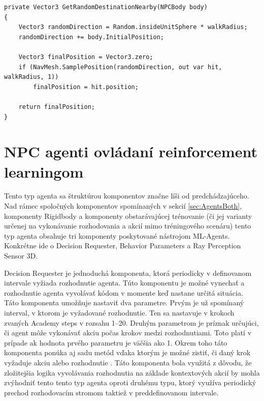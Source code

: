 \documentclass[slovak, master]{diploma}
\begin{document}
\vspace{8pt}
\begin{lstlisting}[label=src:GenRandom,caption={Generovanie náhodného bodu v okolí NPC pomocou NavMeshu}]
private Vector3 GetRandomDestinationNearby(NPCBody body)
{
    Vector3 randomDirection = Random.insideUnitSphere * walkRadius;
    randomDirection += body.InitialPosition;
    
    Vector3 finalPosition = Vector3.zero;
    if (NavMesh.SamplePosition(randomDirection, out var hit, walkRadius, 1))
        finalPosition = hit.position;

    return finalPosition;
}
\end{lstlisting}

\section{NPC agenti ovládaní reinforcement learningom}
\label{sec:AgentsWithBrain}
Tento typ agenta sa štruktúrou komponentov značne líši od predchádzajúceho. Nad rámec spoločných komponentov spomínaných v sekcií \ref{sec:AgentsBoth}, komponenty Rigidbody a komponenty obstarávajúcej trénovanie (či jej varianty určenej na vykonávanie rozhodovania a akcií mimo tréningového scenáru) tento typ agenta obsahuje tri komponenty poskytované nástrojom ML-Agents. Konkrétne ide o Decision Requester, Behavior Parameters a Ray Perception Sensor 3D.

Decision Requester je jednoduchá komponenta, ktorá periodicky v definovanom intervale vyžiada rozhodnutie agenta. Túto komponentu je možné vynechať a rozhodnutie agenta vyvolávať kódom v momente keď nastane určitá situácia. Táto komponenta umožňuje nastaviť dva parametre. Prvým je už spomínaný interval, v ktorom je vyžadované rozhodnutie. Ten sa nastavuje v krokoch zvaných Academy steps v rozsahu 1--20. Druhým parametrom je príznak určujúci, či agent môže vykonávať akciu počas krokov medzi rozhodnutiami. Toto platí v 
prípade ak hodnota prvého parametru je väčšia ako 1. Okrem toho táto komponenta ponúka aj sadu metód vďaka ktorým je možné zistiť, či daný krok vyžaduje akciu alebo rozhodnutie \cite{decReq}. Táto komponenta bola využitá z dôvodu, že zložitejšia logika vyvolávania rozhodnutia na základe kontextových akcií by mohla zvýhodniť tento tento typ agenta oproti druhému typu, ktorý využíva periodický prechod rozhodovacím stromom taktiež v preddefinovanom intervale. 
\end{document}
